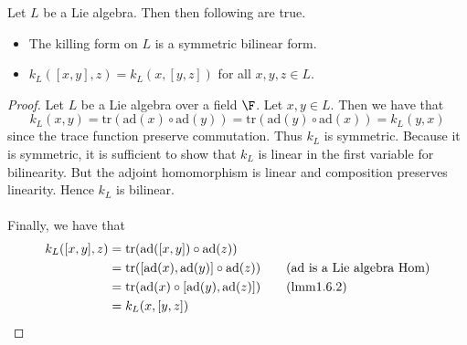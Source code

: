 \documentclass[a4paper]{article}
\begin{document}
\begin{lmm}{}{} Let $L$ be a Lie algebra. Then then following are true. 
\begin{itemize}
\item The killing form on $L$ is a symmetric bilinear form. 
\item $k_L([x,y],z)=k_L(x,[y,z])$ for all $x,y,z\in L$. 
\end{itemize} \tcbline
\begin{proof}
Let $L$ be a Lie algebra over a field $\F$. Let $x,y\in L$. Then we have that $$k_L(x,y)=\text{tr}(\text{ad}(x)\circ\text{ad}(y))=\text{tr}(\text{ad}(y)\circ\text{ad}(x))=k_L(y,x)$$ since the trace function preserve commutation. Thus $k_L$ is symmetric. Because it is symmetric, it is sufficient to show that $k_L$ is linear in the first variable for bilinearity. But the adjoint homomorphism is linear and composition preserves linearity. Hence $k_L$ is bilinear. \\~\\

Finally, we have that 
\begin{align*}
k_L([x,y],z)&=\text{tr}(\text{ad}([x,y])\circ\text{ad}(z))\\
&=\text{tr}([\text{ad}(x),\text{ad}(y)]\circ\text{ad}(z))\tag{$\text{ad}$ is a Lie algebra Hom}\\
&=\text{tr}(\text{ad}(x)\circ[\text{ad}(y),\text{ad}(z)])\tag{lmm1.6.2}\\
&=k_L(x,[y,z])
\end{align*}
\end{proof}
\end{lmm}
\end{document}
